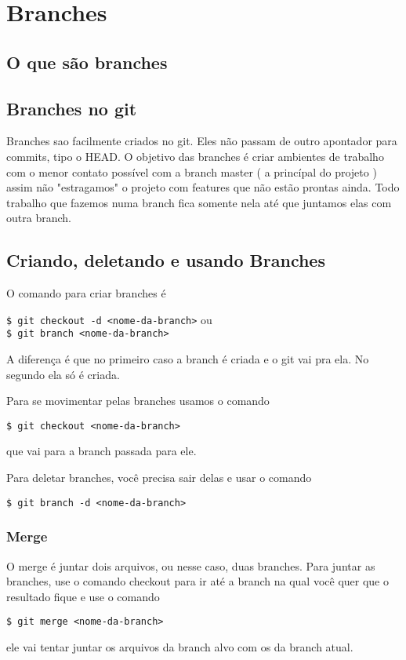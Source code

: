 \documentclass{article}
\begin{document}
\section{Branches}

\subsection{O que são branches}

\subsection{Branches no git}
    Branches sao facilmente criados no git. Eles não passam de outro apontador para 
commits, tipo o HEAD. O objetivo das branches é criar ambientes de trabalho com o
menor contato possível com a branch master ( a princípal do projeto ) assim
não "estragamos" o projeto com features que não estão prontas ainda. Todo trabalho
que fazemos numa branch fica somente nela até que juntamos elas com outra branch.

\subsection{Criando, deletando e usando Branches}
    O comando para criar branches é
\begin{tabbing}
    \hspace{1cm}\=\verb#$ git checkout -d <nome-da-branch># ou\\
                \>\verb#$ git branch <nome-da-branch>#
\end{tabbing}
    A diferença é que no primeiro caso a branch é criada e o git vai pra ela. No segundo
ela só é criada.

    Para se movimentar pelas branches usamos o comando
\begin{tabbing}
    \hspace{1cm}\=\verb#$ git checkout <nome-da-branch>#
\end{tabbing}
    que vai para a branch passada para ele.

    Para deletar branches, você precisa sair delas e usar o comando
\begin{tabbing}
    \hspace{1cm}\=\verb#$ git branch -d <nome-da-branch>#
\end{tabbing}

\subsubsection{Merge}
    O merge é juntar dois arquivos, ou nesse caso, duas branches. Para juntar as
branches, use o comando checkout para ir até a branch na qual você quer que o resultado
fique e use o comando 
\begin{tabbing}
    \hspace{1cm}\=\verb#$ git merge <nome-da-branch>#
\end{tabbing}
ele vai tentar juntar os arquivos da branch alvo com os da branch atual.
\end{document}
